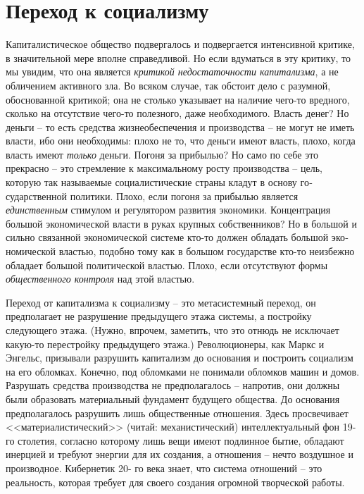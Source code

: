 \documentclass{book}
\begin{document}
\section{Переход к социализму}

Капиталистическое общество подвергалось и подвергается интенсивной критике, в значительной мере вполне справедли­вой. Но если вдуматься в эту критику, то мы увидим, что она является \textit{критикой недостаточности капитализма},  а не обличе­нием активного зла. Во всяком случае, так обстоит дело с ра­зумной, обоснованной критикой; она не столько указывает на наличие чего-то вредного, сколько на отсутствие чего-то полезного, даже необходимого. Власть денег? Но деньги -- то есть средства жизнеобеспечения и производства -- не могут не иметь власти, ибо они необходимы: плохо не то, что деньги имеют власть, плохо, когда власть имеют \textit{только}  деньги. По­гоня за прибылью? Но само по себе это прекрасно -- это стрем­ление к максимальному росту производства -- цель, которую так называемые социалистические страны кладут в основу го­сударственной политики. Плохо, если погоня за прибылью яв­ляется \textit{единственным}  стимулом и регулятором развития эко­номики. Концентрация большой экономической власти в руках крупных собственников? Но в 
большой и сильно связанной экономической системе кто-то должен обладать большой эко­номической властью, подобно тому как в большом государст­ве кто-то неизбежно обладает большой политической властью. Плохо, если отсутствуют формы \textit{общественного контроля}  над этой властью.

Переход от капитализма к социализму -- это метасистемный переход, он предполагает не 
разрушение предыдущего этажа системы, а постройку следующего этажа. (Нужно, впрочем,
заметить, что это отнюдь не исключает какую-то перестройку предыдущего этажа.) 
Революционеры, как Маркс и Энгельс, призывали разрушить капитализм до основания и 
построить социализм на его обломках. Конечно, под обломками не пони­мали обломков 
машин и домов. Разрушать средства произ­водства не предполагалось -- напротив, они 
должны были обра­зовать материальный фундамент будущего общества. До осно­вания  
предполагалось разрушить лишь общественные отно­шения. Здесь просвечивает 
<<материалистический>> (читай: меха­нистический) интеллектуальный фон 19-го столетия, 
согласно которому лишь вещи имеют подлинное бытие, обладают инер­цией и требуют 
энергии для их создания, а отношения -- нечто воздушное и производное. Кибернетик 20-
го века знает, что система отношений -- это реальность, которая требует для своего 
создания огромной творческой работы. 
\end{document}
